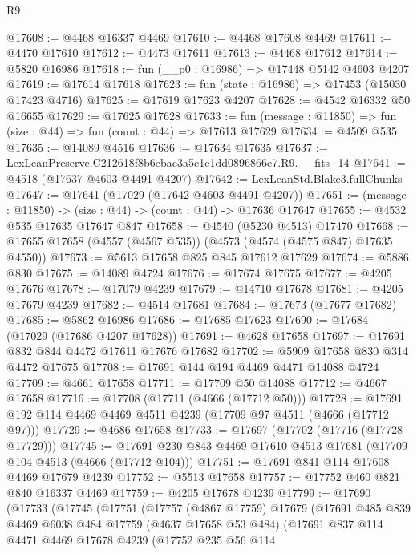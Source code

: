 \begin{lexlean}{R9}
\begin{coremodule}
@17608 := @4468 @16337 @4469
@17610 := @4468 @17608 @4469
@17611 := @4470 @17610
@17612 := @4473 @17611
@17613 := @4468 @17612
@17614 := @5820 @16986
@17618 := fun (__p0 : @16986) => @17448 @5142 @4603 @4207
@17619 := @17614 @17618
@17623 := fun (state : @16986) => @17453 (@15030 @17423 @4716)
@17625 := @17619 @17623 @4207
@17628 := @4542 @16332 @50 @16655
@17629 := @17625 @17628
@17633 := fun (message : @11850) => fun (size : @44) => fun (count : @44) => @17613 @17629
@17634 := @4509 @535
@17635 := @14089 @4516
@17636 := @17634 @17635
@17637 := LexLeanPreserve.C212618f8b6ebac3a5c1e1dd0896866e7.R9.__fits_14
@17641 := @4518 (@17637 @4603 @4491 @4207)
@17642 := LexLeanStd.Blake3.fullChunks
@17647 := @17641 (@17029 (@17642 @4603 @4491 @4207))
@17651 := (message : @11850) -> (size : @44) -> (count : @44) -> @17636 @17647
@17655 := @4532 @535 @17635 @17647 @847
@17658 := @4540 (@5230 @4513) @17470
@17668 := @17655 @17658 (@4557 (@4567 @535)) (@4573 (@4574 (@4575 @847) @17635 @4550))
@17673 := @5613 @17658 @825 @845 @17612 @17629
@17674 := @5886 @830
@17675 := @14089 @4724
@17676 := @17674 @17675
@17677 := @4205 @17676
@17678 := @17079 @4239
@17679 := @14710 @17678
@17681 := @4205 @17679 @4239
@17682 := @4514 @17681
@17684 := @17673 (@17677 @17682)
@17685 := @5862 @16986
@17686 := @17685 @17623
@17690 := @17684 (@17029 (@17686 @4207 @17628))
@17691 := @4628 @17658
@17697 := @17691 @832 @844 @4472 @17611 @17676 @17682
@17702 := @5909 @17658 @830 @314 @4472 @17675
@17708 := @17691 @144 @194 @4469 @4471 @14088 @4724
@17709 := @4661 @17658
@17711 := @17709 @50 @14088
@17712 := @4667 @17658
@17716 := @17708 (@17711 (@4666 (@17712 @50)))
@17728 := @17691 @192 @114 @4469 @4469 @4511 @4239 (@17709 @97 @4511 (@4666 (@17712 @97)))
@17729 := @4686 @17658
@17733 := @17697 (@17702 (@17716 (@17728 @17729)))
@17745 := @17691 @230 @843 @4469 @17610 @4513 @17681 (@17709 @104 @4513 (@4666 (@17712 @104)))
@17751 := @17691 @841 @114 @17608 @4469 @17679 @4239
@17752 := @5513 @17658
@17757 := @17752 @460 @821 @840 @16337 @4469
@17759 := @4205 @17678 @4239
@17799 := @17690
    (@17733
      (@17745
        (@17751
          (@17757
            (@4867 @17759)
            @17679
            (@17691
              @485
              @839
              @4469
              @6038
              @484
              @17759
              (@4637 @17658 @53 @484)
              (@17691
                @837
                @114
                @4471
                @4469
                @17678
                @4239
                (@17752
                  @235
                  @56
                  @114

\end{coremodule}
\end{lexlean}
